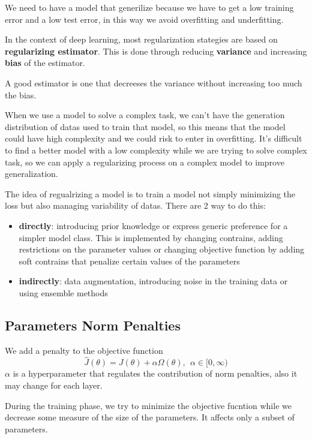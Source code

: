We need to have a model that generilize because we have to get a low training error 
and a low test error, in this way we avoid overfitting and underfitting.

In the context of deep learning, most regularization stategies are based on 
\textbf{regularizing estimator}. This is done through reducing \textbf{variance} and
increasing \textbf{bias} of the estimator.

\begin{note}
    A good estimator is one that decreeses the variance without increasing too much the bias.
\end{note} 

When we use a model to solve a complex task, we can't have the generation distribution 
of datas used to train that model, so this means that the model could have high 
complexity and we could risk to enter in overfitting. 
It's difficult to find a better model with a low complexity while we are trying to 
solve complex task, so we can apply a regularizing process on a complex model to 
improve generalization.

The idea of regualrizing a model is to train a model not simply minimizing the loss
but also managing variability of datas. There are 2 way to do this:
\begin{itemize}
    \item \textbf{directly}: introducing prior knowledge or express generic preference 
    for a simpler model class. This is implemented by changing contrains, adding 
    restrictions on the parameter values or changing objective function by adding 
    soft contrains that penalize certain values of the parameters
    \item \textbf{indirectly}: data augmentation, introducing noise in the training
    data or using ensemble methods
\end{itemize}

\subsection{Parameters Norm Penalties}
We add a penalty to the objective function
$$\hat{J}(\theta) = J(\theta) + \alpha \Omega (\theta), \ \ \alpha\in [0,\infty)$$
$\alpha$ is a hyperparameter that regulates the contribution of norm penalties, 
also it may change for each layer.

During the training phase, we try to minimize the objective fucntion while 
we decrease some measure of the size of the parameters. It affects only a subset 
of parameters.

